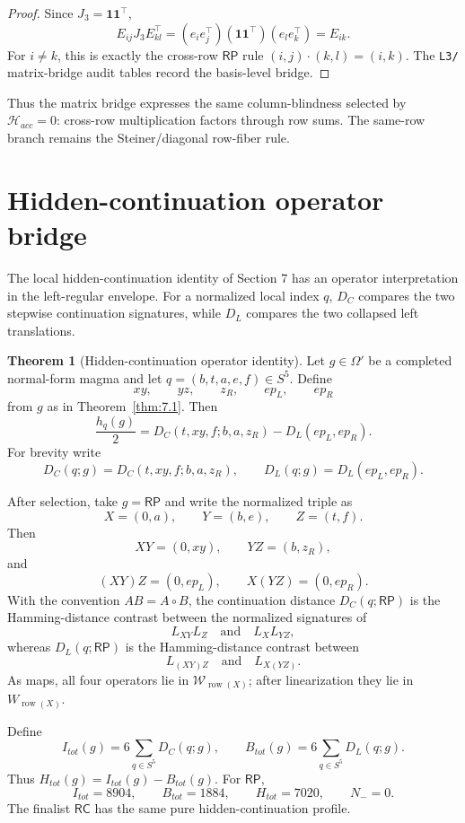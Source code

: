 \documentclass[11pt]{article}
\theoremstyle{definition}
\newtheorem{theorem}{Theorem}[section]
\newcommand{\RP}{\mathsf{RP}}
\newcommand{\RC}{\mathsf{RC}}
\begin{document}
\begin{proof}
Since \(J_3=\mathbf1\mathbf1^\top\),
\[
E_{ij}J_3E_{kl}^\top
=(e_ie_j^\top)(\mathbf1\mathbf1^\top)(e_le_k^\top)
=E_{ik}.
\]
For \(i\ne k\), this is exactly the cross-row \(\RP\) rule
\((i,j)\cdot(k,l)=(i,k)\).  The \texttt{L3/} matrix-bridge audit tables record the basis-level bridge.
\end{proof}

Thus the matrix bridge expresses the same column-blindness selected by
\(\mathcal H_{acc}=0\): cross-row multiplication factors through row sums.
The same-row branch remains the Steiner/diagonal row-fiber rule.

\section{Hidden-continuation operator bridge}\label{hidden-continuation-operator-identity}

The local hidden-continuation identity of Section 7 has an operator
interpretation in the left-regular envelope.  For a normalized local index
\(q\), \(D_C\) compares the two stepwise continuation signatures, while
\(D_L\) compares the two collapsed left translations.

\begin{theorem}[Hidden-continuation operator identity]
\label{thm:17.1}
Let \(g\in\Omega'\) be a completed normal-form magma and let
\(q=(b,t,a,e,f)\in S^5\). Define
\[
xy,\qquad yz,\qquad z_R,\qquad ep_L,\qquad ep_R
\]
from \(g\) as in Theorem~\ref{thm:7.1}. Then
\[
\frac{h_q(g)}2
=
D_C(t,xy,f;b,a,z_R)-D_L(ep_L,ep_R).
\]
For brevity write
\[
D_C(q;g)=D_C(t,xy,f;b,a,z_R),
\qquad
D_L(q;g)=D_L(ep_L,ep_R).
\]

After selection, take \(g=\RP\) and write the normalized triple as
\[
X=(0,a),\qquad Y=(b,e),\qquad Z=(t,f).
\]
Then
\[
XY=(0,xy),\qquad YZ=(b,z_R),
\]
and
\[
(XY)Z=(0,ep_L),\qquad X(YZ)=(0,ep_R).
\]
With the convention \(AB=A\circ B\), the continuation distance
\(D_C(q;\RP)\) is the Hamming-distance contrast between the normalized
signatures of
\[
L_{XY}L_Z
\quad\text{and}\quad
L_XL_{YZ},
\]
whereas \(D_L(q;\RP)\) is the Hamming-distance contrast between
\[
L_{(XY)Z}
\quad\text{and}\quad
L_{X(YZ)}.
\]
As maps, all four operators lie in
\(\mathcal W_{\operatorname{row}(X)}\); after linearization they lie in
\(W_{\operatorname{row}(X)}\).

Define
\[
I_{tot}(g)=6\sum_{q\in S^5}D_C(q;g),
\qquad
B_{tot}(g)=6\sum_{q\in S^5}D_L(q;g).
\]
Thus \(H_{tot}(g)=I_{tot}(g)-B_{tot}(g)\). For \(\RP\),
\[
I_{tot}=8904,
\qquad
B_{tot}=1884,
\qquad
H_{tot}=7020,
\qquad
N_-=0.
\]
The finalist \(\RC\) has the same pure hidden-continuation profile.
\end{theorem}
\end{document}
